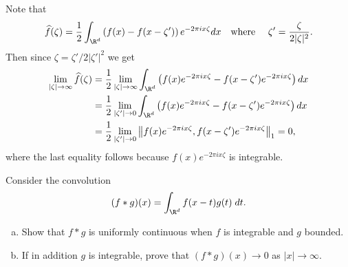 \documentclass[11pt,letterpaper]{article}
\begin{document}
\begin{solution}
    Note that
    \[
        \widehat{f}(\zeta) = \frac{1}{2}\int_{\R^d}\left(f(x)-f(x-\zeta')\right)e^{-2\pi i x\zeta}dx \quad \text{where }\quad\zeta'=\frac{\zeta}{2|\zeta|^2}
    .\] 
    Then since $\zeta=\zeta' / 2|\zeta'|^2$ we get
    \[
        \begin{aligned}
            \lim_{|\zeta| \to \infty} \widehat{f}(\zeta) &= \frac{1}{2}\lim_{|\zeta|\to \infty}\int_{\R^d}\left(f(x)e^{-2\pi i x\zeta}-f(x-\zeta')e^{-2\pi i x\zeta}\right)dx\\
            &= \frac{1}{2}\lim_{|\zeta'|\to 0}\int_{\R^d}\left(f(x)e^{-2\pi i x\zeta}-f(x-\zeta')e^{-2\pi i x\zeta}\right)dx\\
            &= \frac{1}{2}\lim_{|\zeta'|\to 0}\left\|f(x)e^{-2\pi ix\zeta}, f(x-\zeta')e^{-2\pi i x\zeta}\right\|_1=0,
        \end{aligned}
    \] 
    where the last equality follows because $f(x)e^{-2\pi i x\zeta}$ is integrable.
\end{solution}

\begin{cproblem}{24} Consider the convolution
    \[
        (f * g)(x)=\int_{\R^d} f(x-t)g(t)\;dt
    .\] 
    \begin{enumerate}[(a)]
        \item Show that $f * g$ is uniformly continuous when $f$ is integrable and $g$ bounded.
        \item If in addition $g$ is integrable, prove that $(f*g)(x)\to 0$ as $|x|\to \infty$.
    \end{enumerate}
\end{cproblem}
\end{document}
